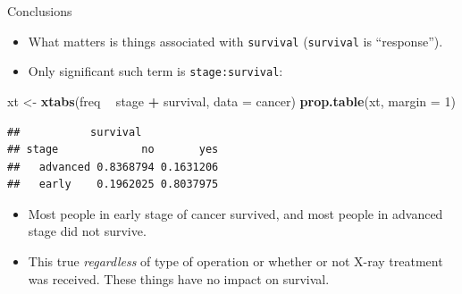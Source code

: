 \documentclass[ignorenonframetext,]{beamer}
\newenvironment{Shaded}{\begin{snugshade}}{\end{snugshade}}
\newcommand{\DataTypeTok}[1]{\textcolor[rgb]{0.13,0.29,0.53}{#1}}
\newcommand{\DecValTok}[1]{\textcolor[rgb]{0.00,0.00,0.81}{#1}}
\newcommand{\KeywordTok}[1]{\textcolor[rgb]{0.13,0.29,0.53}{\textbf{#1}}}
\newcommand{\NormalTok}[1]{#1}
\newcommand{\OperatorTok}[1]{\textcolor[rgb]{0.81,0.36,0.00}{\textbf{#1}}}
\newcommand{\StringTok}[1]{\textcolor[rgb]{0.31,0.60,0.02}{#1}}
\begin{document}
\begin{frame}[fragile]{Conclusions}
\protect\hypertarget{conclusions-5}{}

\begin{itemize}
\item
  What matters is things associated with \texttt{survival}
  (\texttt{survival} is ``response'').
\item
  Only significant such term is \texttt{stage:survival}:
\end{itemize}

\begin{Shaded}
\begin{Highlighting}[]
\NormalTok{xt <-}\StringTok{ }\KeywordTok{xtabs}\NormalTok{(freq }\OperatorTok{~}\StringTok{ }\NormalTok{stage }\OperatorTok{+}\StringTok{ }\NormalTok{survival, }\DataTypeTok{data =}\NormalTok{ cancer)}
\KeywordTok{prop.table}\NormalTok{(xt, }\DataTypeTok{margin =} \DecValTok{1}\NormalTok{)}
\end{Highlighting}
\end{Shaded}

\begin{verbatim}
##           survival
## stage             no       yes
##   advanced 0.8368794 0.1631206
##   early    0.1962025 0.8037975
\end{verbatim}

\begin{itemize}
\item
  Most people in early stage of cancer survived, and most people in
  advanced stage did not survive.
\item
  This true \emph{regardless} of type of operation or whether or not
  X-ray treatment was received. These things have no impact on survival.
\end{itemize}

\end{frame}
\end{document}
